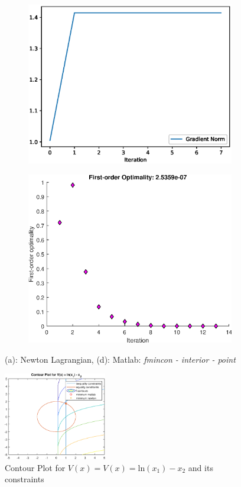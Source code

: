 \begin{figure}[h!]
\hfill
\begin{subfigure}[t]{0.4\textwidth}
\centering
    \includegraphics[width=\textwidth]{images/python/al-pF-ln.eps}
    \caption{}
    \label{fig:TSNE}
\end{subfigure}
\hfill
\begin{subfigure}[t]{0.4\textwidth}
\centering
    \includegraphics[width=\textwidth]{images/matlab/2c_loss.eps}
    \caption{}
    \label{fig:TSNE}
\end{subfigure}
\caption{(a): Newton Lagrangian, (d): Matlab: \textit{fmincon - interior - point}}
\end{figure}
\begin{figure}
    \centering
    \includegraphics[width=0.4\textwidth]{images/matlab/matlab_2c.eps}
    \caption{Contour Plot for $V(x) =  V(x) = \mbox{ln}(x_1)- x_2$ and its constraints}
\end{figure}